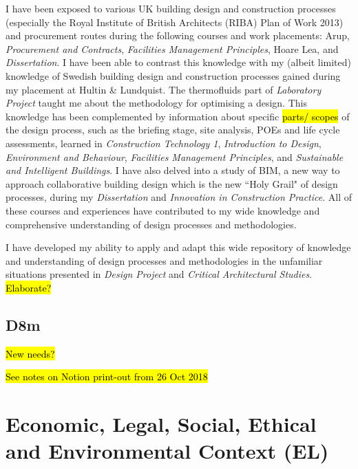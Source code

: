 I have been exposed to various UK building design and construction processes (especially the Royal Institute of British Architects (RIBA) Plan of Work 2013) and procurement routes during the following courses and work placements:
Arup,
\textit{Procurement and Contracts},
\textit{Facilities Management Principles},
Hoare Lea,
and
\textit{Dissertation}.
I have been able to contrast this knowledge with my (albeit limited) knowledge of Swedish building design and construction processes gained during my placement at Hultin \& Lundquist.
The thermofluids part of \textit{Laboratory Project} taught me about the methodology for optimising a design.
This knowledge has been complemented by information about specific \hl{parts/ scopes} of the design process, such as the briefing stage, site analysis, POEs and life cycle assessments, learned in
\textit{Construction Technology 1},
\textit{Introduction to Design},
\textit{Environment and Behaviour},
\textit{Facilities Management Principles},
and \textit{Sustainable and Intelligent Buildings}.
I have also delved into a study of BIM, a new way to approach collaborative building design which is the new ``Holy Grail" of design processes, during my \textit{Dissertation} and \textit{Innovation in Construction Practice}.
All of these courses and experiences have contributed to my wide knowledge and comprehensive understanding of design processes and methodologies.

I have developed my ability to apply and adapt this wide repository of knowledge and understanding of design processes and methodologies in the unfamiliar situations presented in \textit{Design Project} and \textit{Critical Architectural Studies}.
\hl{Elaborate?}


\subsection*{D8m}

\hl{New needs?}

\hl{See notes on Notion print-out from 26 Oct 2018}



\section{Economic, Legal, Social, Ethical and Environmental Context (EL)}

